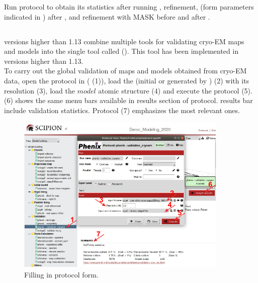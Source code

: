   Run \molprobity protocol to obtain its statistics after running \chimera {}, \coot refinement, \phenix {} (form parameters indicated in ) after \coot, and  refinement with MASK before and after \phenix {}. 
  
  \subsection*{\validationCryoEM}
  
  \phenix versions higher than 1.13 combine multiple tools for validating cryo-EM maps and models into the single tool called \validationCryoEM (\citep{afonine2018b}). This tool has been implemented in \phenix versions higher than 1.13.\\
  
  To carry out the global validation of maps and models obtained from cryo-EM data, open the protocol  in \scipion ( (1)), load the  (initial or generated by \coot) (2) with its resolution (3), load the $model$ atomic structure (4) and execute the protocol (5).  (6) shows the same menu bars available in results section of \phenix {} protocol. \molprobity results bar include validation statistics. Protocol  (7) emphasizes the most relevant ones.\\
  
  \begin{figure}[H]
    \centering 
    \captionsetup{width=.9\linewidth} 
    \includegraphics[width=0.90\textwidth]{Images/Fig60}
    \caption{Filling in \phenix \validationCryoEM protocol form.}
    \label{fig:validationCryoEM_protocol}
    \end{figure}
  
